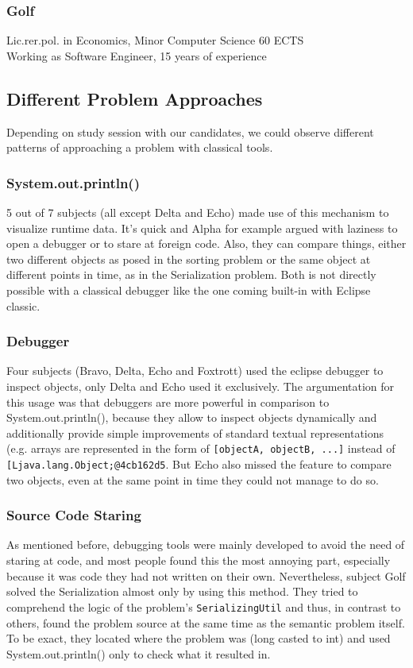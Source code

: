 \documentclass{acm_proc_article-sp}
\begin{document}
\subsubsection{Golf} %
Lic.rer.pol. in Economics, Minor Computer Science 60 ECTS\\
Working as Software Engineer, 15 years of experience

\subsection{Different Problem Approaches}
Depending on study session with our candidates, we could observe different patterns of approaching a problem with classical tools.
\subsubsection{System.out.println()}
5 out of 7 subjects (all except Delta and Echo) made use of this mechanism to visualize runtime data. It's quick and Alpha for example argued with laziness to open a debugger or to stare at foreign code. Also, they can compare things, either two different objects as posed in the sorting problem or the same object at different points in time, as in the Serialization problem. Both is not directly possible with a classical debugger like the one coming built-in with Eclipse classic.
\subsubsection{Debugger}
Four subjects (Bravo, Delta, Echo and Foxtrott) used the eclipse debugger to inspect objects, only Delta and Echo used it exclusively. The argumentation for this usage was that debuggers are more powerful in comparison to System.out.println(), because they allow to inspect objects dynamically and additionally provide simple improvements of standard textual representations (e.g. arrays are represented in the form of \verb-[objectA, objectB, ...]- instead of \verb-[Ljava.lang.Object;@4cb162d5-. But Echo also missed the feature to compare two objects, even at the same point in time they could not manage to do so.
\subsubsection{Source Code Staring}
As mentioned before, debugging tools were mainly developed to avoid the need of staring at code, and most people found this the most annoying part, especially because it was code they had not written on their own. Nevertheless, subject Golf solved the Serialization almost only by using this method. They tried to comprehend the logic of the problem's \verb.SerializingUtil. and thus, in contrast to others, found the problem source at the same time as the semantic problem itself. To be exact, they located where the problem was (long casted to int) and used System.out.println() only to check what it resulted in.
\end{document}
